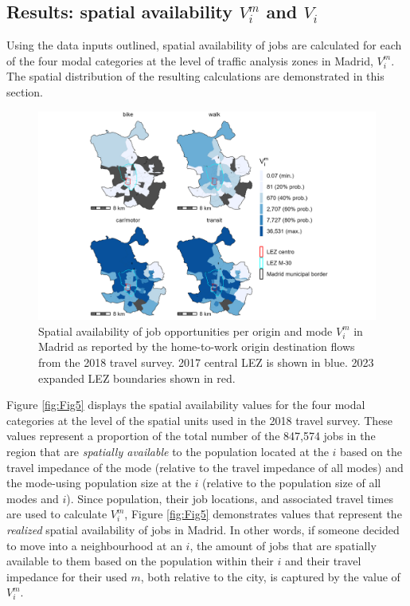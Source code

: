 \documentclass[numbered]{trbunofficial}
\begin{document}
\hypertarget{results-spatial-availability-v_im-and-v_i}{%
\subsection{\texorpdfstring{Results: spatial availability \(V_i^m\) and
\(V_i\)}{Results: spatial availability V\_i\^{}m and V\_i}}\label{results-spatial-availability-v_im-and-v_i}}

Using the data inputs outlined, spatial availability of jobs are
calculated for each of the four modal categories at the level of traffic
analysis zones in Madrid, \(V_i^m\). The spatial distribution of the
resulting calculations are demonstrated in this section.

\begin{figure}

{\centering \includegraphics[width=1\linewidth]{images/SA_im_V_zn208_plot} 

}

\caption{\label{fig:Fig5} Spatial availability of job opportunities per origin and mode $V_i^m$ in Madrid as reported by the home-to-work origin destination flows from the 2018 travel survey. 2017 central LEZ is shown in blue. 2023 expanded LEZ boundaries shown in red.}\label{fig:SA-m-plot}
\end{figure}

Figure \ref{fig:Fig5} displays the spatial availability values for the
four modal categories at the level of the spatial units used in the 2018
travel survey. These values represent a proportion of the total number
of the 847,574 jobs in the region that are \emph{spatially available} to
the population located at the \(i\) based on the travel impedance of the
mode (relative to the travel impedance of all modes) and the mode-using
population size at the \(i\) (relative to the population size of all
modes and \(i\)). Since population, their job locations, and associated
travel times are used to calculate \(V_i^m\), Figure \ref{fig:Fig5}
demonstrates values that represent the \emph{realized} spatial
availability of jobs in Madrid. In other words, if someone decided to
move into a neighbourhood at an \(i\), the amount of jobs that are
spatially available to them based on the population within their \(i\)
and their travel impedance for their used \(m\), both relative to the
city, is captured by the value of \(V_i^m\).
\end{document}

